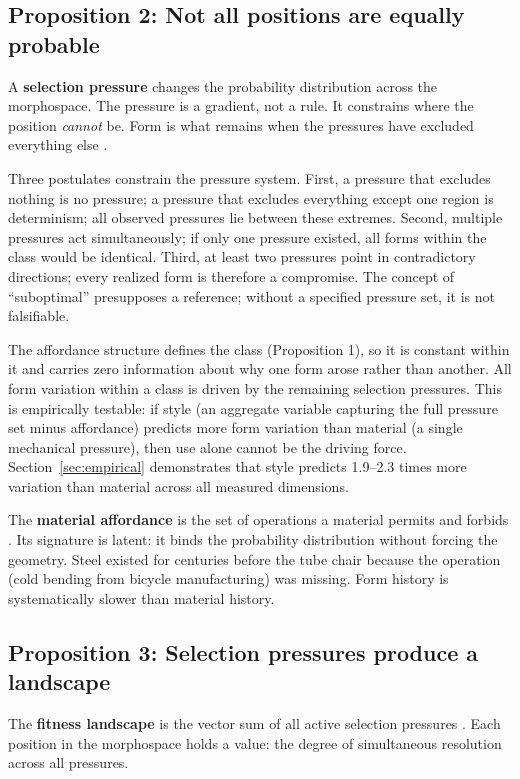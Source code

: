 \subsection{Proposition 2: Not all positions are equally probable}
\label{sec:prop2}

A \textbf{selection pressure} changes the probability distribution across the morphospace. The pressure is a gradient, not a rule. It constrains where the position \textit{cannot} be. Form is what remains when the pressures have excluded everything else \parencite{Michl1995}.

Three postulates constrain the pressure system. First, a pressure that excludes nothing is no pressure; a pressure that excludes everything except one region is determinism; all observed pressures lie between these extremes. Second, multiple pressures act simultaneously; if only one pressure existed, all forms within the class would be identical. Third, at least two pressures point in contradictory directions; every realized form is therefore a compromise. The concept of ``suboptimal'' presupposes a reference; without a specified pressure set, it is not falsifiable.

The affordance structure defines the class (Proposition 1), so it is constant within it and carries zero information about why one form arose rather than another. All form variation within a class is driven by the remaining selection pressures. This is empirically testable: if style (an aggregate variable capturing the full pressure set minus affordance) predicts more form variation than material (a single mechanical pressure), then use alone cannot be the driving force. Section~\ref{sec:empirical} demonstrates that style predicts 1.9--2.3 times more variation than material across all measured dimensions.

The \textbf{material affordance} is the set of operations a material permits and forbids \parencite{Gibson1979}. Its signature is latent: it binds the probability distribution without forcing the geometry. Steel existed for centuries before the tube chair because the operation (cold bending from bicycle manufacturing) was missing. Form history is systematically slower than material history.

\subsection{Proposition 3: Selection pressures produce a landscape}
\label{sec:prop3}

The \textbf{fitness landscape} is the vector sum of all active selection pressures \parencite{Wright1932, Waddington1957}. Each position in the morphospace holds a value: the degree of simultaneous resolution across all pressures.

